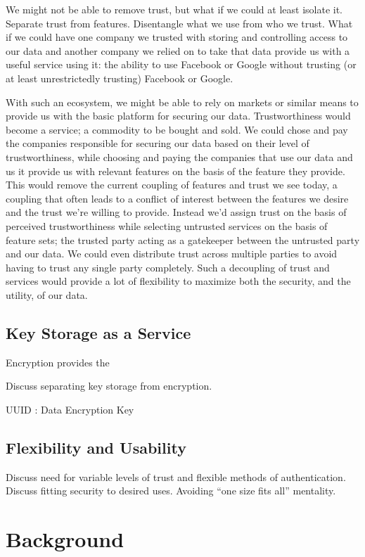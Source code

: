 We might not be able to remove trust, but what if we could at least
isolate it. Separate trust from features. Disentangle what we use from
who we trust. What if we could have one company we trusted with
storing and controlling access to our data and another company we
relied on to take that data provide us with a useful service using it:
the ability to use Facebook or Google without trusting (or at least
unrestrictedly trusting) Facebook or Google.

With such an ecosystem, we might be able to rely on markets or similar
means to provide us with the basic platform for securing our
data. Trustworthiness would become a service; a commodity to be bought
and sold. We could chose and pay the companies responsible for
securing our data based on their level of trustworthiness, while
choosing and paying the companies that use our data and us it provide
us with relevant features on the basis of the feature they
provide. This would remove the current coupling of features and trust
we see today, a coupling that often leads to a conflict of interest
between the features we desire and the trust we're willing to
provide. Instead we'd assign trust on the basis of perceived
trustworthiness while selecting untrusted services on the basis of
feature sets; the trusted party acting as a gatekeeper between the
untrusted party and our data. We could even distribute trust across
multiple parties to avoid having to trust any single party
completely. Such a decoupling of trust and services would provide a
lot of flexibility to maximize both the security, and the utility, of
our data.

\subsection{Key Storage as a Service}

Encryption provides the

Discuss separating key storage from encryption.

UUID : Data Encryption Key

\subsection{Flexibility and Usability}

Discuss need for variable levels of trust and flexible methods of
authentication. Discuss fitting security to desired uses. Avoiding
``one size fits all'' mentality.

\section{Background}

